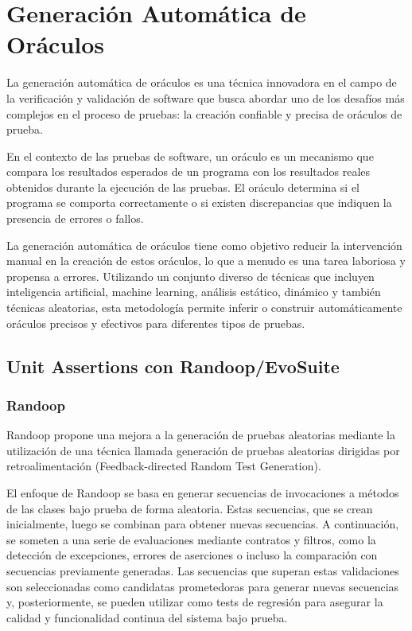 \chapter{Generación Automática de Oráculos}

La generación automática de oráculos es una técnica innovadora en el campo de la verificación y validación de software que busca abordar uno de los desafíos más complejos en el proceso de pruebas: la creación confiable y precisa de oráculos de prueba.

En el contexto de las pruebas de software, un oráculo es un mecanismo que compara los resultados esperados de un programa con los resultados reales obtenidos durante la ejecución de las pruebas. El oráculo determina si el programa se comporta correctamente o si existen discrepancias que indiquen la presencia de errores o fallos.

La generación automática de oráculos tiene como objetivo reducir la intervención manual en la creación de estos oráculos, lo que a menudo es una tarea laboriosa y propensa a errores. Utilizando un conjunto diverso de técnicas que incluyen inteligencia artificial, machine learning, análisis estático, dinámico y también técnicas aleatorias, esta metodología permite inferir o construir automáticamente oráculos precisos y efectivos para diferentes tipos de pruebas.

\section{Unit Assertions con Randoop/EvoSuite}

\subsection{Randoop}

Randoop propone una mejora a la generación de pruebas aleatorias mediante la utilización de una técnica llamada generación de pruebas aleatorias dirigidas por retroalimentación (Feedback-directed Random Test Generation).

El enfoque de Randoop se basa en generar secuencias de invocaciones a métodos de las clases bajo prueba de forma aleatoria. Estas secuencias, que se crean inicialmente, luego se combinan para obtener nuevas secuencias. A continuación, se someten a una serie de evaluaciones mediante contratos y filtros, como la detección de excepciones, errores de aserciones o incluso la comparación con secuencias previamente generadas. Las secuencias que superan estas validaciones son seleccionadas como candidatas prometedoras para generar nuevas secuencias y, posteriormente, se pueden utilizar como tests de regresión para asegurar la calidad y funcionalidad continua del sistema bajo prueba.

